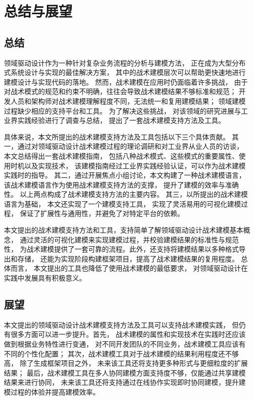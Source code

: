 \chapter{总结与展望}

\section{总结}

领域驱动设计作为一种针对复杂业务流程的分析与建模方法，
正在成为大型分布式系统设计与实现的最佳解决方案，
其中的战术建模层次可以帮助更快速地进行建模设计与实现代码的落地。
然而，战术建模在应用时仍面临着许多挑战，
由于对战术模式的规范和约束不明确，往往会导致战术建模结果不够标准和规范；
开发人员和架构师对战术建模理解程度不同，无法统一和复用建模结果；
领域建模过程缺少相应的支持平台和工具。
为了解决这些挑战，
对该领域的研究进展与工业界实践经验进行了调查与总结，
提出了一套战术建模支持方法及工具。

具体来说，本文所提出的战术建模支持方法及工具包括以下三个具体贡献。
其一，通过对领域驱动设计战术建模过程的理论调研和对工业界从业人员的访谈，
本文总结得出一套战术建模指南，
包括八种战术模式、这些模式的重要属性、使用时机以及实现技术，
该建模指南经过工业界实践经验认证，可以作为战术建模实践时的指导。
其二，通过开展焦点小组讨论，本文构建了一种战术建模语言，
该战术建模语言作为使用战术建模支持方法的支撑，
提升了建模的效率与准确性。
以上两点构成了战术建模支持方法的主要内容。
其三，以所提出的战术建模语言为基础，
本文还实现了一个建模支持工具，
实现了灵活易用的可视化建模过程，
保证了扩展性与通用性，并避免了对特定平台的依赖。

本文提出的战术建模支持方法和工具，支持简单了解领域驱动设计战术建模基本概念，
通过灵活的可视化建模来实现建模过程，并校验建模结果的标准性与规范性，
为战术建模提供了一套可靠的流程。此外，还支持将建模结果以多种格式导出和存储，
还能为实现阶段构建框架项目，提高了战术建模结果的复用程度。
总体而言，
本文提出的工具也降低了使用战术建模的最低要求，
对领域驱动设计在实践中发展具有积极意义。

\section{展望}

本文提出的领域驱动设计战术建模支持方法及工具可以支持战术建模实践，
但仍有很多方面可以进一步提升。首先，
战术建模的属性和实现技术在实践时还应该做到根据业务特性进行变通，
对不同开发团队的不同业务，战术建模工具应该有不同的个性化配置；
其次，战术建模工具对于战术建模的结果利用程度还不够高，
除了生成框架项目之外，
未来该工具还将支持更多种形式与更细粒度的扩展结果；
最后，战术建模工具在多人协同建模方面支持度不够，仅能通过共享建模结果来进行协同，
未来该工具还将支持通过在线协作实现即时协同建模，提升建模过程的体验并提高建模效率。




